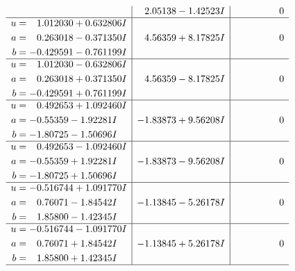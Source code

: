 \documentclass[1p]{elsarticle_modified}
\theoremstyle{definition}
\begin{document}
$$\begin{array}{c|c|c}
 & \phantom{-}2.05138 - 1.42523 I & \phantom{-0.000000 } 0 \\ \hline\begin{aligned}
u &= \phantom{-}1.012030 + 0.632806 I \\
a &= \phantom{-}0.263018 - 0.371350 I \\
b &= -0.429591 - 0.761199 I\end{aligned}
 & \phantom{-}4.56359 + 8.17825 I & \phantom{-0.000000 } 0 \\ \hline\begin{aligned}
u &= \phantom{-}1.012030 - 0.632806 I \\
a &= \phantom{-}0.263018 + 0.371350 I \\
b &= -0.429591 + 0.761199 I\end{aligned}
 & \phantom{-}4.56359 - 8.17825 I & \phantom{-0.000000 } 0 \\ \hline\begin{aligned}
u &= \phantom{-}0.492653 + 1.092460 I \\
a &= -0.55359 - 1.92281 I \\
b &= -1.80725 - 1.50696 I\end{aligned}
 & -1.83873 + 9.56208 I & \phantom{-0.000000 } 0 \\ \hline\begin{aligned}
u &= \phantom{-}0.492653 - 1.092460 I \\
a &= -0.55359 + 1.92281 I \\
b &= -1.80725 + 1.50696 I\end{aligned}
 & -1.83873 - 9.56208 I & \phantom{-0.000000 } 0 \\ \hline\begin{aligned}
u &= -0.516744 + 1.091770 I \\
a &= \phantom{-}0.76071 - 1.84542 I \\
b &= \phantom{-}1.85800 - 1.42345 I\end{aligned}
 & -1.13845 - 5.26178 I & \phantom{-0.000000 } 0 \\ \hline\begin{aligned}
u &= -0.516744 - 1.091770 I \\
a &= \phantom{-}0.76071 + 1.84542 I \\
b &= \phantom{-}1.85800 + 1.42345 I\end{aligned}
 & -1.13845 + 5.26178 I & \phantom{-0.000000 } 0\\
 \hline 
 \end{array}$$\newpage$$\begin{array}{c|c|c}  

\end{array}$$
\end{document}
